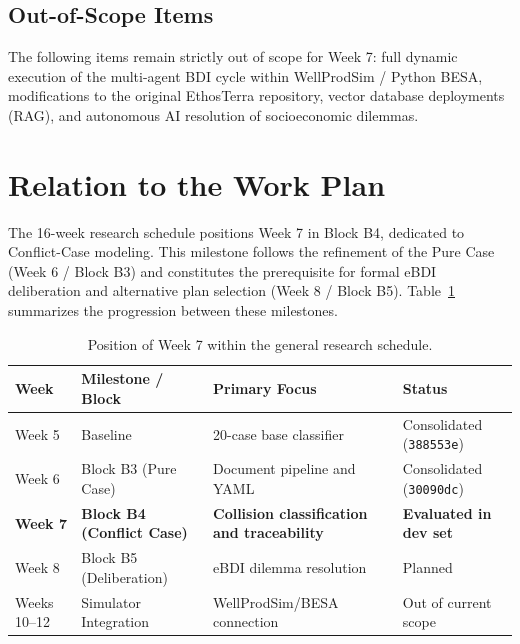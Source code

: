 \documentclass[11pt,a4paper]{article}
\begin{document}
\subsection{Out-of-Scope Items}
The following items remain strictly out of scope for Week 7: full dynamic execution of the multi-agent BDI cycle within WellProdSim / Python BESA, modifications to the original EthosTerra repository, vector database deployments (RAG), and autonomous AI resolution of socioeconomic dilemmas.

\section{Relation to the Work Plan}
The 16-week research schedule positions Week 7 in Block B4, dedicated to Conflict-Case modeling. This milestone follows the refinement of the Pure Case (Week 6 / Block B3) and constitutes the prerequisite for formal eBDI deliberation and alternative plan selection (Week 8 / Block B5). Table~\ref{tab:work_plan} summarizes the progression between these milestones.

\begin{table}[H]
\centering
\small
\caption{Position of Week 7 within the general research schedule.}
\label{tab:work_plan}
\begin{tabularx}{\textwidth}{lp{4.2cm}p{4.2cm}X}
\toprule
\textbf{Week} & \textbf{Milestone / Block} & \textbf{Primary Focus} & \textbf{Status} \\
\midrule
Week 5 & Baseline & 20-case base classifier & Consolidated (\texttt{388553e}) \\
Week 6 & Block B3 (Pure Case) & Document pipeline and YAML & Consolidated (\texttt{30090dc}) \\
\textbf{Week 7} & \textbf{Block B4 (Conflict Case)} & \textbf{Collision classification and traceability} & \textbf{Evaluated in dev set} \\
Week 8 & Block B5 (Deliberation) & eBDI dilemma resolution & Planned \\
Weeks 10--12 & Simulator Integration & WellProdSim/BESA connection & Out of current scope \\
\bottomrule
\end{tabularx}
\end{table}

\end{document}
